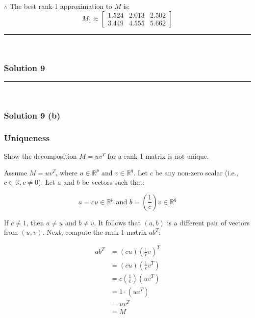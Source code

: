\documentclass{article}
\begin{document}
{\subsubsection*{\normalfont}{$\therefore$ The best rank-1 approximation to $M$ is:}
\[
M_1 \approx \begin{bmatrix}
    1.524 & 2.013 & 2.502 \\
    3.449 & 4.555 & 5.662
    \end{bmatrix}
\]


\noindent\rule{\textwidth}{0.4pt}\\

\newpage

\subsubsection*{Solution 9}
\noindent\rule{\textwidth}{0.4pt}\\
\subsubsection*{Solution 9 (b)}
\subsubsection*{Uniqueness}
Show the decomposition $M = u v^T$ for a rank-1 matrix is not unique.
\begin{flushleft}
Assume $M = u v^T$, where $u \in \mathbb{R}^{p}$ and $v \in \mathbb{R}^{q}$.
Let $c$ be any non-zero scalar (i.e., $c \in \mathbb{R}, c \neq 0$).
Let $a$ and $b$ be vectors such that:
\end{flushleft}

$$a = c u \in \mathbb{R}^{p} \text{ and }b = \left(\frac{1}{c}\right) v \in \mathbb{R}^{q}$$
\begin{flushleft}
If $c \neq 1$, then $a \neq u$ and $b \neq v$. It follows that $(a, b)$ is a different pair of vectors from $(u, v)$.
Next, compute the rank-1 matrix $a b^T$:
\end{flushleft}

\begin{align*}
    a b^T &= (c u) \left( \frac{1}{c} v \right)^T \\
    &= (c u) \left( \frac{1}{c} v^T \right) \\
    &= c \left( \frac{1}{c} \right) (u v^T) \\
    &= 1 \cdot (u v^T) \\
    &= u v^T \\
    &= M
\end{align*}

}
\end{document}
